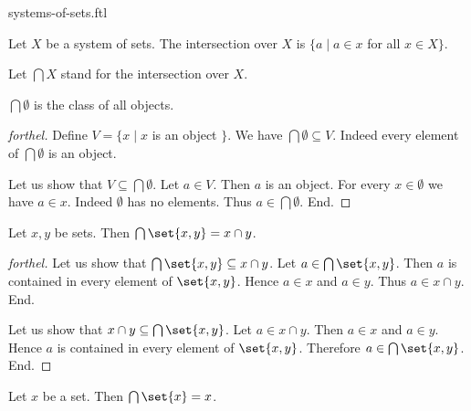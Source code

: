 \documentclass{naproche-library}
\begin{document}
\begin{smodule}{systems-of-sets.ftl}
  \begin{definition}[forthel,id=FOUNDATIONS_10_2659345095458816,printid]
    Let $X$ be a system of sets.
    The intersection over $X$ is $\{ a \mid a \in x$ for all $x \in X \}$.

    Let $\bigcap X$ stand for the intersection over $X$.
  \end{definition}

  \begin{proposition}[forthel,id=FOUNDATIONS_10_2809770322952192,printid]
    $\bigcap \emptyset$ is the class of all objects.
  \end{proposition}
  \begin{proof}[forthel]
    Define $V = \{ x \mid x$ is an object $\}$.
    We have $\bigcap \emptyset \subseteq V$.
    Indeed every element of $\bigcap \emptyset$ is an object.

    Let us show that $V \subseteq \bigcap \emptyset$.
      Let $a \in V$.
      Then $a$ is an object.
      For every $x \in \emptyset$ we have $a \in x$.
      Indeed $\emptyset$ has no elements.
      Thus $a \in \bigcap \emptyset$.
    End.
  \end{proof}

  \begin{proposition}[forthel,id=FOUNDATIONS_10_7851827447988224,printid]
    Let $x, y$ be sets.
    Then $\bigcap \set{x, y} = x \cap y$.
  \end{proposition}
  \begin{proof}[forthel]
    Let us show that $\bigcap \set{x, y} \subseteq x \cap y$.
      Let $a \in \bigcap \set{x, y}$.
      Then $a$ is contained in every element of $\set{x, y}$.
      Hence $a \in x$ and $a \in y$.
      Thus $a \in x \cap y$.
    End.

    Let us show that $x \cap y \subseteq \bigcap \set{x, y}$.
      Let $a \in x \cap y$.
      Then $a \in x$ and $a \in y$.
      Hence $a$ is contained in every element of $\set{x, y}$.
      Therefore $a \in \bigcap \set{x, y}$.
    End.
  \end{proof}

  \begin{corollary}[forthel,id=FOUNDATIONS_10_7239895674257408,printid]
    Let $x$ be a set.
    Then $\bigcap \set{x} = x$.
  \end{corollary}
\end{smodule}
\end{document}
